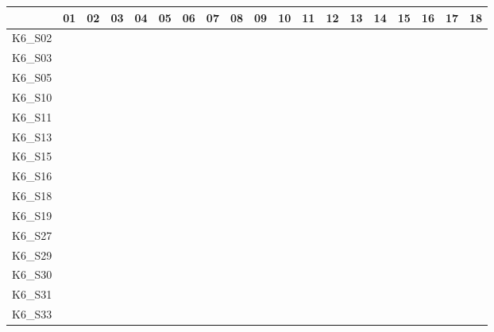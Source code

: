 \begin{table}[htpb]
    \setlength{\tabcolsep}{0.2em}
    \tiny
    \centering
    \begin{tabular}{l|rrrrrrrrrrrrrrrrrr}
        \toprule
                & 01 & 02 & 03 & 04 & 05 & 06 & 07 & 08 & 09 & 10 & 11 & 12 & 13 & 14 & 15 & 16 & 17 & 18 \\
        \midrule
        K6\_S02 & \y & \y & \y & \y & \y & \y & \y & \y & \y & \y & \y & \y & \y & \x & \y & \y & \x & \y \\
        K6\_S03 & \y & \y & \y & \y & \y & \y & \y & \y & \y & \y & \y & \x & \y & \y & \y & \y & \y & \y \\
        K6\_S05 & \y & \y & \y & \y & \y & \y & \y & \y & \y & \y & \y & \x & \x & \x & \x & \y & \y & \y \\
        K6\_S10 & \y & \x & \x & \y & \y & \y & \y & \y & \y & \y & \y & \y & \x & \x & \y & \x & \y & \y \\
        K6\_S11 & \y & \y & \y & \y & \y & \y & \y & \y & \y & \y & \y & \x & \y & \y & \y & \y & \y & \y \\
        K6\_S13 & \y & \y & \y & \y & \y & \y & \y & \y & \y & \y & \y & \y & \y & \y & \y & \y & \y & \y \\
        K6\_S15 & \y & \y & \y & \y & \y & \y & \y & \y & \y & \y & \y & \y & \y & \y & \y & \y & \y & \y \\
        K6\_S16 & \y & \y & \y & \y & \y & \y & \y & \y & \y & \y & \y & \y & \y & \y & \y & \y & \y & \y \\
        K6\_S18 & \y & \x & \x & \y & \y & \y & \y & \y & \y & \y & \y & \y & \x & \y & \y & \y & \y & \y \\
        K6\_S19 & \y & \y & \y & \y & \y & \y & \y & \y & \y & \y & \y & \y & \y & \y & \x & \y & \y & \y \\
        K6\_S27 & \y & \y & \y & \y & \y & \y & \y & \y & \y & \y & \y & \y & \y & \y & \y & \y & \y & \y \\
        K6\_S29 & \y & \y & \x & \y & \y & \y & \y & \y & \y & \y & \y & \y & \y & \y & \x & \y & \x & \y \\
        K6\_S30 & \y & \x & \x & \y & \y & \y & \y & \y & \y & \y & \y & \y & \x & \x & \y & \y & \y & \y \\
        K6\_S31 & \y & \y & \y & \y & \y & \y & \y & \x & \y & \y & \y & \y & \y & \y & \y & \y & \y & \y \\
        K6\_S33 & \y & \y & \y & \y & \y & \y & \y & \x & \y & \y & \y & \x & \y & \y & \y & \y & \y & \y \\

\end{tabular}
\end{table}
